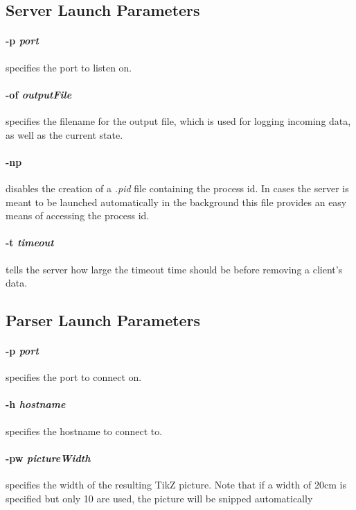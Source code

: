 \subsection*{Server Launch Parameters}
\paragraph{-p \textit{port}} specifies the port to listen on.

\paragraph{-of \textit{outputFile}} specifies the filename for the output file, which is used for logging incoming data, as well as the current state.

\paragraph{-np} disables the creation of a \textit{.pid} file containing the process id.
In cases the server is meant to be launched automatically in the background this file provides an easy means of accessing the process id.

\paragraph{-t \textit{timeout}} tells the server how large the timeout time should be before removing a client's data.

\subsection*{Parser Launch Parameters}
\paragraph{-p \textit{port}} specifies the port to connect on.

\paragraph{-h \textit{hostname}} specifies the hostname to connect to.

\paragraph{-pw \textit{pictureWidth}} specifies the width of the resulting TikZ picture.
Note that if a width of 20cm is specified but only 10 are used, the picture will be snipped automatically

